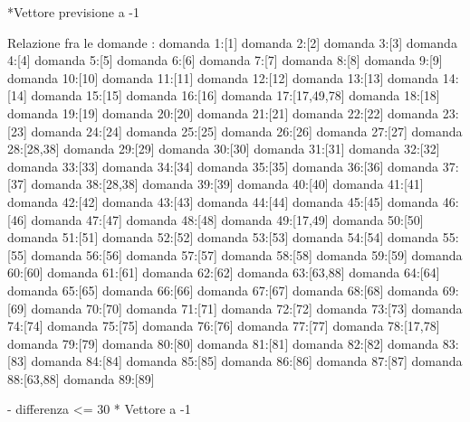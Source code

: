 *Vettore previsione a -1

Relazione fra le domande :
domanda 1:[1]
domanda 2:[2]
domanda 3:[3]
domanda 4:[4]
domanda 5:[5]
domanda 6:[6]
domanda 7:[7]
domanda 8:[8]
domanda 9:[9]
domanda 10:[10]
domanda 11:[11]
domanda 12:[12]
domanda 13:[13]
domanda 14:[14]
domanda 15:[15]
domanda 16:[16]
domanda 17:[17,49,78]
domanda 18:[18]
domanda 19:[19]
domanda 20:[20]
domanda 21:[21]
domanda 22:[22]
domanda 23:[23]
domanda 24:[24]
domanda 25:[25]
domanda 26:[26]
domanda 27:[27]
domanda 28:[28,38]
domanda 29:[29]
domanda 30:[30]
domanda 31:[31]
domanda 32:[32]
domanda 33:[33]
domanda 34:[34]
domanda 35:[35]
domanda 36:[36]
domanda 37:[37]
domanda 38:[28,38]
domanda 39:[39]
domanda 40:[40]
domanda 41:[41]
domanda 42:[42]
domanda 43:[43]
domanda 44:[44]
domanda 45:[45]
domanda 46:[46]
domanda 47:[47]
domanda 48:[48]
domanda 49:[17,49]
domanda 50:[50]
domanda 51:[51]
domanda 52:[52]
domanda 53:[53]
domanda 54:[54]
domanda 55:[55]
domanda 56:[56]
domanda 57:[57]
domanda 58:[58]
domanda 59:[59]
domanda 60:[60]
domanda 61:[61]
domanda 62:[62]
domanda 63:[63,88]
domanda 64:[64]
domanda 65:[65]
domanda 66:[66]
domanda 67:[67]
domanda 68:[68]
domanda 69:[69]
domanda 70:[70]
domanda 71:[71]
domanda 72:[72]
domanda 73:[73]
domanda 74:[74]
domanda 75:[75]
domanda 76:[76]
domanda 77:[77]
domanda 78:[17,78]
domanda 79:[79]
domanda 80:[80]
domanda 81:[81]
domanda 82:[82]
domanda 83:[83]
domanda 84:[84]
domanda 85:[85]
domanda 86:[86]
domanda 87:[87]
domanda 88:[63,88]
domanda 89:[89]

- differenza <= 30
* Vettore a -1

